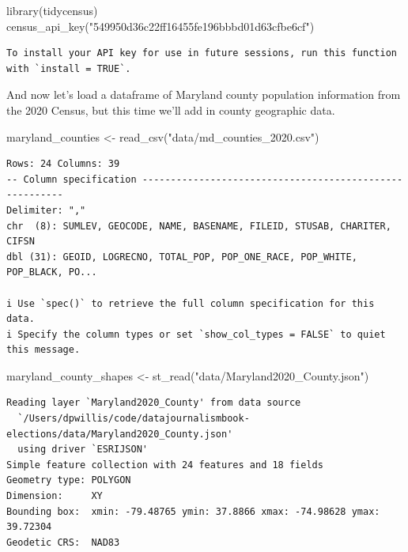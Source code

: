 \documentclass[
  letterpaper,
  DIV=11,
  numbers=noendperiod]{scrreprt}
\newenvironment{Shaded}{\begin{snugshade}}{\end{snugshade}}
\newcommand{\FunctionTok}[1]{\textcolor[rgb]{0.28,0.35,0.67}{#1}}
\newcommand{\NormalTok}[1]{\textcolor[rgb]{0.00,0.23,0.31}{#1}}
\newcommand{\OtherTok}[1]{\textcolor[rgb]{0.00,0.23,0.31}{#1}}
\newcommand{\StringTok}[1]{\textcolor[rgb]{0.13,0.47,0.30}{#1}}
\begin{document}
\begin{Shaded}
\begin{Highlighting}[]
\FunctionTok{library}\NormalTok{(tidycensus)}
\FunctionTok{census\_api\_key}\NormalTok{(}\StringTok{"549950d36c22ff16455fe196bbbd01d63cfbe6cf"}\NormalTok{)}
\end{Highlighting}
\end{Shaded}

\begin{verbatim}
To install your API key for use in future sessions, run this function with `install = TRUE`.
\end{verbatim}

And now let's load a dataframe of Maryland county population information
from the 2020 Census, but this time we'll add in county geographic data.

\begin{Shaded}
\begin{Highlighting}[]
\NormalTok{maryland\_counties }\OtherTok{\textless{}{-}} \FunctionTok{read\_csv}\NormalTok{(}\StringTok{"data/md\_counties\_2020.csv"}\NormalTok{)}
\end{Highlighting}
\end{Shaded}

\begin{verbatim}
Rows: 24 Columns: 39
-- Column specification --------------------------------------------------------
Delimiter: ","
chr  (8): SUMLEV, GEOCODE, NAME, BASENAME, FILEID, STUSAB, CHARITER, CIFSN
dbl (31): GEOID, LOGRECNO, TOTAL_POP, POP_ONE_RACE, POP_WHITE, POP_BLACK, PO...

i Use `spec()` to retrieve the full column specification for this data.
i Specify the column types or set `show_col_types = FALSE` to quiet this message.
\end{verbatim}

\begin{Shaded}
\begin{Highlighting}[]
\NormalTok{maryland\_county\_shapes }\OtherTok{\textless{}{-}} \FunctionTok{st\_read}\NormalTok{(}\StringTok{"data/Maryland2020\_County.json"}\NormalTok{)}
\end{Highlighting}
\end{Shaded}

\begin{verbatim}
Reading layer `Maryland2020_County' from data source 
  `/Users/dpwillis/code/datajournalismbook-elections/data/Maryland2020_County.json' 
  using driver `ESRIJSON'
Simple feature collection with 24 features and 18 fields
Geometry type: POLYGON
Dimension:     XY
Bounding box:  xmin: -79.48765 ymin: 37.8866 xmax: -74.98628 ymax: 39.72304
Geodetic CRS:  NAD83
\end{verbatim}
\end{document}

